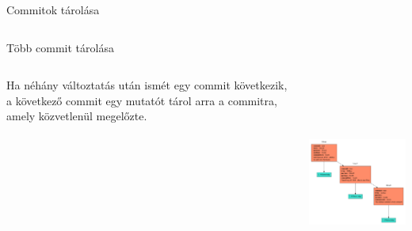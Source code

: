 \documentclass[english, aspectratio=169]{beamer}
\begin{document}
\begin{frame}{Commitok tárolása}
\begin{columns}
\begin{column}{0.7\textwidth}
\begin{center}
				\end{center}
			\end{column}
		\end{columns}
	\end{frame}
	
	\begin{frame}{Több commit tárolása}
		\begin{columns}
			\begin{column}{.4\textwidth}
				Ha néhány változtatás után ismét egy commit következik, a következő commit egy mutatót tárol arra a commitra, amely közvetlenül megelőzte.\\
			\end{column}
			\begin{column}{.6\textwidth}
				\begin{center}
					\includegraphics[height=7cm, keepaspectratio]{graphs/git_8.png}
				\end{center}
			\end{column}
		\end{columns}
	\end{frame}
	
\end{document}

